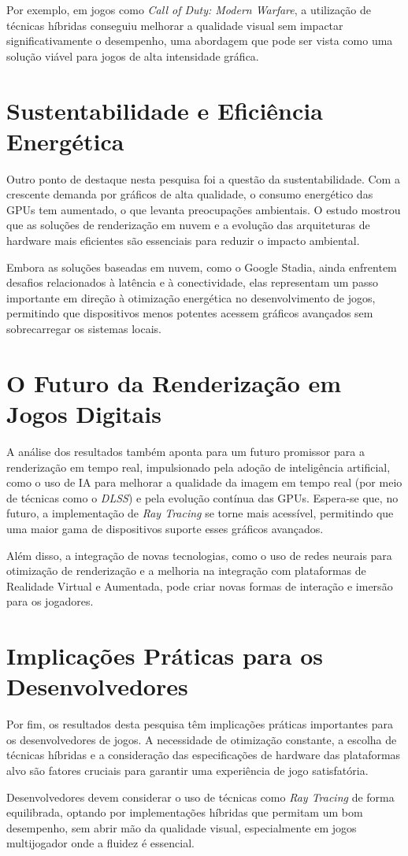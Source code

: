 Por exemplo, em jogos como \textit{Call of Duty: Modern Warfare}, a utilização de técnicas híbridas conseguiu melhorar a qualidade visual sem impactar significativamente o desempenho, uma abordagem que pode ser vista como uma solução viável para jogos de alta intensidade gráfica.

\section{Sustentabilidade e Eficiência Energética}
Outro ponto de destaque nesta pesquisa foi a questão da sustentabilidade. Com a crescente demanda por gráficos de alta qualidade, o consumo energético das GPUs tem aumentado, o que levanta preocupações ambientais. O estudo mostrou que as soluções de renderização em nuvem e a evolução das arquiteturas de hardware mais eficientes são essenciais para reduzir o impacto ambiental.

Embora as soluções baseadas em nuvem, como o Google Stadia, ainda enfrentem desafios relacionados à latência e à conectividade, elas representam um passo importante em direção à otimização energética no desenvolvimento de jogos, permitindo que dispositivos menos potentes acessem gráficos avançados sem sobrecarregar os sistemas locais.

\section{O Futuro da Renderização em Jogos Digitais}
A análise dos resultados também aponta para um futuro promissor para a renderização em tempo real, impulsionado pela adoção de inteligência artificial, como o uso de IA para melhorar a qualidade da imagem em tempo real (por meio de técnicas como o \textit{DLSS}) e pela evolução contínua das GPUs. Espera-se que, no futuro, a implementação de \textit{Ray Tracing} se torne mais acessível, permitindo que uma maior gama de dispositivos suporte esses gráficos avançados.

Além disso, a integração de novas tecnologias, como o uso de redes neurais para otimização de renderização e a melhoria na integração com plataformas de Realidade Virtual e Aumentada, pode criar novas formas de interação e imersão para os jogadores.

\section{Implicações Práticas para os Desenvolvedores}
Por fim, os resultados desta pesquisa têm implicações práticas importantes para os desenvolvedores de jogos. A necessidade de otimização constante, a escolha de técnicas híbridas e a consideração das especificações de hardware das plataformas alvo são fatores cruciais para garantir uma experiência de jogo satisfatória.

Desenvolvedores devem considerar o uso de técnicas como \textit{Ray Tracing} de forma equilibrada, optando por implementações híbridas que permitam um bom desempenho, sem abrir mão da qualidade visual, especialmente em jogos multijogador onde a fluidez é essencial.

